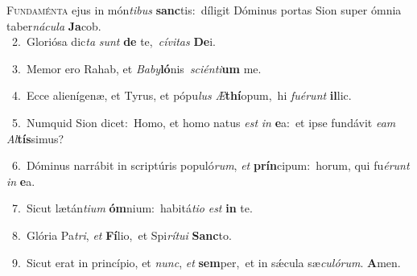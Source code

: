 \lettrine{\initial\textcolor{\initialcolor}{F}}{undaménta} ejus in món\-\textit{ti}\-\textit{bus} \textbf{sanc}\-tis:~\star díligit Dóminus portas Sion super ómnia taber\-\textit{ná}\-\textit{cu}\textit{la} \textbf{Ja}\-cob.\\
{\numbfont\textcolor{\numbcolor}{~2.}}~Gloriósa dic\textit{ta} \textit{sunt} \textbf{de} te,~\star \textit{cí}\-\textit{vi}\textit{tas} \textbf{De}\-i.\par
{\numbfont\textcolor{\numbcolor}{~3.}}~Memor ero Rahab, et \textit{Ba}\-\textit{by}\textbf{ló}nis~\star \textit{sci}\-\textit{én}\textit{ti}\textbf{um} me.\par
{\numbfont\textcolor{\numbcolor}{~4.}}~Ecce alienígenæ, et Tyrus, et pópu\textit{lus} \textit{Æ}\-\textbf{thí}opum,~\star hi \textit{fu}\-\textit{é}\textit{runt} \textbf{il}\-lic.\par
{\numbfont\textcolor{\numbcolor}{~5.}}~Numquid Sion dicet:~\dagger Homo, et homo natus \textit{est} \textit{in} \textbf{e}\-a:~\star et ipse fundávit \textit{e}\-\textit{am} \textit{Al}\-\textbf{tís}simus?\par
{\numbfont\textcolor{\numbcolor}{~6.}}~Dóminus narrábit in scriptúris populó\-\textit{rum}\-, \textit{et} \textbf{prín}\-cipum:~\star horum, qui fu\-\textit{é}\-\textit{runt} \textit{in} \textbf{e}\-a.\par
{\numbfont\textcolor{\numbcolor}{~7.}}~Sicut lætán\-\textit{ti}\-\textit{um} \textbf{óm}\-nium:~\star habitá\-\textit{ti}\-\textit{o} \textit{est} \textbf{in} te.\par
{\numbfont\textcolor{\numbcolor}{~8.}}~Glória Pa\-\textit{tri}\-, \textit{et} \textbf{Fí}\-lio,~\star et Spi\-\textit{rí}\-\textit{tu}\textit{i} \textbf{Sanc}\-to.\par
{\numbfont\textcolor{\numbcolor}{~9.}}~Sicut erat in princípio, et \textit{nunc}\-, \textit{et} \textbf{sem}\-per,~\star et in sǽcula sæ\-\textit{cu}\-\textit{ló}\textit{rum}. \textbf{A}\-men.\par

